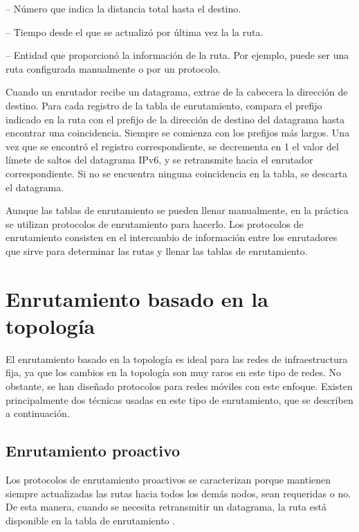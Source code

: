  -- Número que indica la distancia total hasta el destino.

 -- Tiempo desde el que se actualizó por última vez la
la ruta.

 -- Entidad que proporcionó la
información de la ruta. Por ejemplo, puede ser una ruta configurada manualmente
o por un protocolo.

Cuando un enrutador recibe un datagrama, extrae de la cabecera la dirección de
destino. Para cada registro de la tabla de enrutamiento, compara el prefijo
indicado en la ruta con el prefijo de la dirección de destino del datagrama
hasta encontrar una coincidencia. Siempre se comienza con los prefijos más
largos. Una vez que se encontró el registro correspondiente, se decrementa en 1
el valor del límete de saltos del datagrama IPv6, y se retransmite hacia el
enrutador correspondiente. Si no se encuentra ninguna coincidencia en la tabla,
se descarta el datagrama.

Aunque las tablas de enrutamiento se pueden llenar manualmente, en la práctica
se utilizan protocolos de enrutamiento para hacerlo. Los protocolos de
enrutamiento consisten en el intercambio de información entre los enrutadores
que sirve para determinar las rutas y llenar las tablas de enrutamiento.

\section{Enrutamiento basado en la topología}
\label{sec:enrutamiento_basado_en_la_topologia}

El enrutamiento basado en la topología es ideal para las redes de
infraestructura fija, ya que los cambios en la topología son muy raros en este
tipo de redes. No obstante, se han diseñado protocolos para redes móviles con
este enfoque. Existen principalmente dos técnicas usadas en este tipo de
enrutamiento, que se describen a continuación.

\subsection{Enrutamiento proactivo}
\label{subsec:enrutamiento_proactivo}

Los protocolos de enrutamiento proactivos se caracterizan porque mantienen
siempre actualizadas las rutas hacia todos los demás nodos, sean requeridas o
no. De esta manera, cuando se necesita retransmitir un datagrama, la ruta está
disponible en la tabla de enrutamiento \cite{Wenden2005}.

